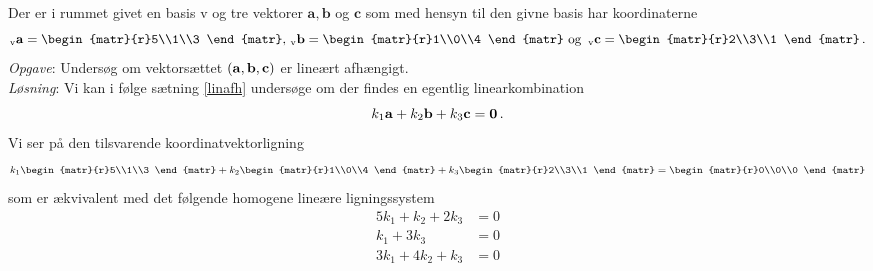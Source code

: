 \begin{example}\label{tn6.koordmatrix2}
Der er i rummet givet en basis v og tre vektorer $\mathbf a,\mathbf b$ og $\mathbf c$ som med hensyn til den givne basis har koordinaterne
$$
{_\mathrm{v}\mathbf{a}}=\begin{matr}{r}5\\1\\3 \end{matr},\,
{_\mathrm{v}\mathbf{b}}=\begin{matr}{r}1\\0\\4 \end{matr}\,\,\mathrm{og}\,\,\,
{_\mathrm{v}\mathbf{c}}=\begin{matr}{r}2\\3\\1 \end{matr}\,.
$$
\textit{Opgave}: Undersøg om vektorsættet $(\mathbf{a},\mathbf{b},\mathbf{c})$ er lineært afhængigt.
\smallskip\\
\textit{Løsning}: Vi kan i følge sætning \ref{linafh} undersøge om der findes en egentlig linearkombination
$$
k_1\mathbf a+k_2\mathbf b+k_3\mathbf c=\bm{0}\,.
$$ 
Vi ser på den tilsvarende koordinatvektorligning
$$
k_1\begin{matr}{r}5\\1\\3 \end{matr}+k_2\begin{matr}{r}1\\0\\4 \end{matr}+k_3\begin{matr}{r}2\\3\\1 \end{matr}=\begin{matr}{r}0\\0\\0 \end{matr}
$$
som er ækvivalent med det følgende homogene lineære ligningssystem
\begin{equation}
\begin{aligned}
5k_1+k_2+2k_3&=0\\
k_1+3k_3&=0\\
3k_1+4k_2+k_3&=0
\end{aligned}
\end{equation}

\end{example}
